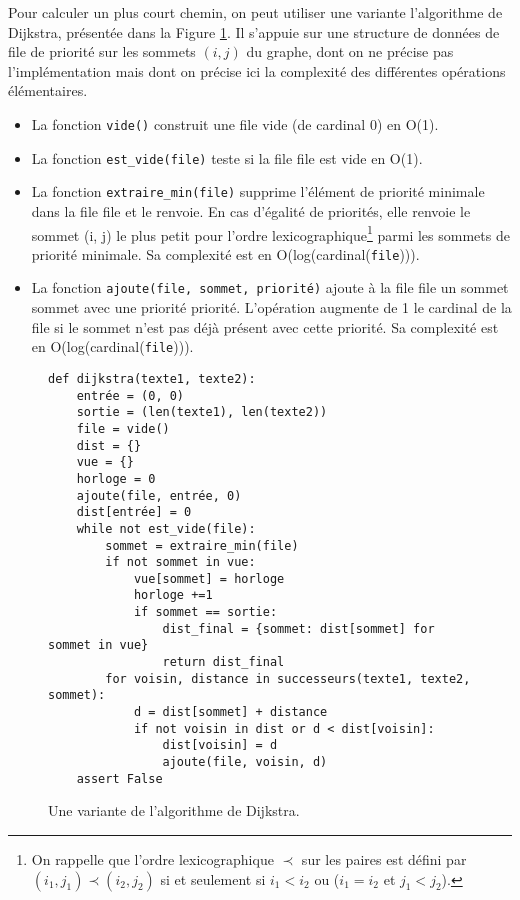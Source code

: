 Pour calculer un plus court chemin, on peut utiliser une variante l'algorithme de Dijkstra,
présentée dans la Figure \ref{fig:05}. Il s'appuie sur une structure de données de file de priorité sur les
sommets $(i, j)$ du graphe, dont on ne précise pas l'implémentation mais dont on précise ici la
complexité des différentes opérations élémentaires.
\begin{itemize}
\item La fonction \lstinline{vide()} construit une file vide (de cardinal 0) en O(1).
\item La fonction \lstinline{est_vide(file)} teste si la file file est vide en O(1).
\item La fonction \lstinline{extraire_min(file)} supprime l'élément de priorité minimale dans la file file
et le renvoie. En cas d'égalité de priorités, elle renvoie le sommet (i, j) le plus petit pour
l'ordre lexicographique\footnote{On rappelle que l’ordre lexicographique $\prec$ 
sur les paires est défini par $(i_1, j_1) \prec (i_2, j_2)$ si et seulement si $i_1<i_2$ ou ($i_1=i_2$ et $j_1<j_2$).} parmi les sommets de priorité minimale. Sa complexité est en
O(log(cardinal(\lstinline{file}))).
\item La fonction \lstinline{ajoute(file, sommet, priorité)} ajoute à la file file un sommet sommet
avec une priorité priorité. L'opération augmente de 1 le cardinal de la file si le sommet
n'est pas déjà présent avec cette priorité. Sa complexité est en O(log(cardinal(\lstinline{file}))).
\end{itemize}

\begin{figure}[H]
\begin{lstlisting}
def dijkstra(texte1, texte2):
    entrée = (0, 0)
    sortie = (len(texte1), len(texte2))
    file = vide()
    dist = {}
    vue = {}
    horloge = 0
    ajoute(file, entrée, 0)
    dist[entrée] = 0
    while not est_vide(file):
        sommet = extraire_min(file)
        if not sommet in vue:
            vue[sommet] = horloge
            horloge +=1
            if sommet == sortie:
                dist_final = {sommet: dist[sommet] for sommet in vue}
                return dist_final
        for voisin, distance in successeurs(texte1, texte2, sommet):
            d = dist[sommet] + distance
            if not voisin in dist or d < dist[voisin]:
                dist[voisin] = d
                ajoute(file, voisin, d)
    assert False
\end{lstlisting}
\caption{Une variante de l’algorithme de Dijkstra. \label{fig:05}}
\end{figure}

